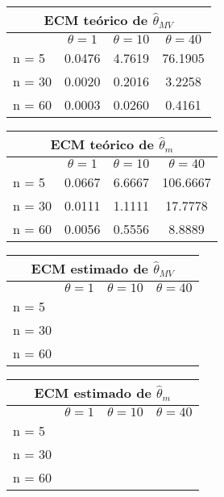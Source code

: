 \documentclass[a4paper,spanish]{report}
\begin{document}
\begin{table}[h!]
	\begin{tabular}{|l | c | c | c |}
		\hline
		\multicolumn{4}{|c|}{ECM te\'orico de $\hat{\theta}_{MV}$} \\	
		\hline
		 & $\theta = 1$ & $\theta = 10$ & $\theta = 40$  \\
		\hline 
		n = 5 & 0.0476 & 4.7619 & 76.1905\\
		\hline
		n = 30 & 0.0020 & 0.2016 & 3.2258\\
		\hline
		n = 60 & 0.0003 & 0.0260 & 0.4161\\
		\hline
	\end{tabular}
\end{table}

\begin{table}[h!]
	\begin{tabular}{|l | c | c | c |}
		\hline
		\multicolumn{4}{|c|}{ECM te\'orico de $\hat{\theta}_{m}$} \\	
		\hline
		 & $\theta = 1$ & $\theta = 10$ & $\theta = 40$  \\
		\hline 
		n = 5 & 0.0667 & 6.6667 & 106.6667\\
		\hline
		n = 30 & 0.0111 & 1.1111 & 17.7778\\
		\hline
		n = 60 & 0.0056 & 0.5556 & 8.8889\\
		\hline
	\end{tabular}
\end{table}

\begin{table}[h!]
	\begin{tabular}{|l | c | c | c |}
		\hline
		\multicolumn{4}{|c|}{ECM estimado de $\hat{\theta}_{MV}$} \\	
		\hline
		 & $\theta = 1$ & $\theta = 10$ & $\theta = 40$  \\
		\hline 
		n = 5 & & & \\
		\hline
		n = 30 & & & \\
		\hline
		n = 60 & & & \\
		\hline
	\end{tabular}
\end{table}

\begin{table}[h!]
	\begin{tabular}{|l | c | c | c |}
		\hline
		\multicolumn{4}{|c|}{ECM estimado de $\hat{\theta}_{m}$} \\	
		\hline
		 & $\theta = 1$ & $\theta = 10$ & $\theta = 40$  \\
		\hline 
		n = 5 & & & \\
		\hline
		n = 30 & & & \\
		\hline
		n = 60 & & & \\
		\hline
	\end{tabular}
\end{table}
\end{document}
